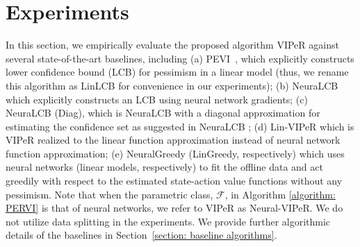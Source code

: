 \documentclass{article} \usepackage{iclr2023/iclr2023_conference,times}
\begin{document}
%
 \vspace{-5pt}
\section{Experiments}
In this section, we empirically evaluate the proposed algorithm VIPeR against several state-of-the-art baselines, including (a) PEVI~\citep{jin2021pessimism}, which explicitly constructs lower confidence bound (LCB) for pessimism in a linear model (thus, we rename this algorithm as LinLCB for convenience in our experiments); (b) NeuraLCB~\citep{nguyen2021offline} which explicitly constructs an LCB using neural network gradients; (c) NeuraLCB (Diag), which is NeuraLCB with a diagonal approximation for estimating the confidence set as suggested in NeuraLCB \citep{nguyen2021offline}; (d) Lin-VIPeR which is VIPeR realized to the linear function approximation instead of neural network function approximation; (e) NeuralGreedy (LinGreedy, respectively) which uses neural networks (linear models, respectively) to fit the offline data and act greedily with respect to the estimated state-action value functions without any pessimism. Note that when the parametric class, $\mathcal{F}$, in Algorithm \ref{algorithm: PERVI} is that of neural networks, we refer to VIPeR as Neural-VIPeR. We do not utilize data splitting in the experiments. We provide further algorithmic details of the baselines in Section~\ref{section: baseline algorithms}. 
\end{document}
